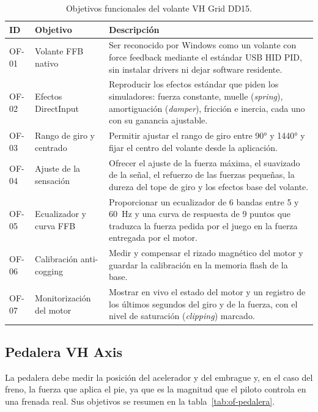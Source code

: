 \begin{table}[htbp]
	\centering
	\caption{Objetivos funcionales del volante VH Grid DD15.}
	\label{tab:of-volante}
	\small
	\begin{tabularx}{\textwidth}{@{}l>{\raggedright\arraybackslash}p{3.6cm}X@{}}
		\toprule
		\textbf{ID} & \textbf{Objetivo} & \textbf{Descripción} \\
		\midrule
		OF-01 & Volante FFB nativo &
		Ser reconocido por Windows como un volante con force feedback mediante el estándar USB HID PID, sin instalar drivers ni dejar software residente. \\
		OF-02 & Efectos DirectInput &
		Reproducir los efectos estándar que piden los simuladores: fuerza constante, muelle (\emph{spring}), amortiguación (\emph{damper}), fricción e inercia, cada uno con su ganancia ajustable. \\
		OF-03 & Rango de giro y centrado &
		Permitir ajustar el rango de giro entre 90° y 1440° y fijar el centro del volante desde la aplicación. \\
		OF-04 & Ajuste de la sensación &
		Ofrecer el ajuste de la fuerza máxima, el suavizado de la señal, el refuerzo de las fuerzas pequeñas, la dureza del tope de giro y los efectos base del volante. \\
		OF-05 & Ecualizador y curva FFB &
		Proporcionar un ecualizador de 6 bandas entre 5 y 60~Hz y una curva de respuesta de 9 puntos que traduzca la fuerza pedida por el juego en la fuerza entregada por el motor. \\
		OF-06 & Calibración anti-cogging &
		Medir y compensar el rizado magnético del motor y guardar la calibración en la memoria flash de la base. \\
		OF-07 & Monitorización del motor &
		Mostrar en vivo el estado del motor y un registro de los últimos segundos del giro y de la fuerza, con el nivel de saturación (\emph{clipping}) marcado. \\
		\bottomrule
	\end{tabularx}
\end{table}

\subsection{Pedalera VH Axis}
\label{subsec:of-pedalera}

La pedalera debe medir la posición del acelerador y del embrague y, en el caso del freno, la fuerza que aplica el pie, ya que es la magnitud que el piloto controla en una frenada real. Sus objetivos se resumen en la tabla~\ref{tab:of-pedalera}.

